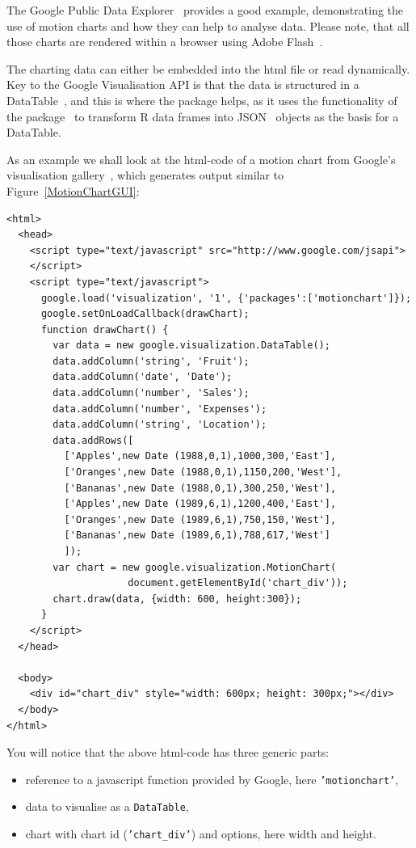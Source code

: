 The Google Public Data Explorer~\cite{GooglePublicData} provides a
good example, demonstrating the use of motion charts and how they can
help to analyse data. Please note, that all those charts are rendered
within a browser using Adobe Flash~\cite{Flash}.

The charting data can either be embedded into the html file or read
dynamically. Key to the Google Visualisation API is that the data is
structured in a DataTable~\cite{DataTable}, and this is where the \googleVis
package helps, as it uses the functionality of the \rjsonio
package~\cite{RJSONIO} to transform R data frames into
JSON~\cite{json} objects as the basis for a DataTable.

As an example we shall look at the html-code of a motion chart from Google's visualisation 
gallery~\cite{GoogleMotionChart}, which generates output similar to
Figure~\ref{MotionChartGUI}:

\begin{verbatim}
<html>
  <head>
    <script type="text/javascript" src="http://www.google.com/jsapi">
    </script>
    <script type="text/javascript">
      google.load('visualization', '1', {'packages':['motionchart']});
      google.setOnLoadCallback(drawChart);
      function drawChart() {
        var data = new google.visualization.DataTable();
        data.addColumn('string', 'Fruit');
        data.addColumn('date', 'Date');
        data.addColumn('number', 'Sales');
        data.addColumn('number', 'Expenses');
        data.addColumn('string', 'Location');
        data.addRows([
          ['Apples',new Date (1988,0,1),1000,300,'East'],
          ['Oranges',new Date (1988,0,1),1150,200,'West'],
          ['Bananas',new Date (1988,0,1),300,250,'West'],
          ['Apples',new Date (1989,6,1),1200,400,'East'],
          ['Oranges',new Date (1989,6,1),750,150,'West'],
          ['Bananas',new Date (1989,6,1),788,617,'West']
          ]);
        var chart = new google.visualization.MotionChart(
                     document.getElementById('chart_div'));
        chart.draw(data, {width: 600, height:300});
      }
    </script>
  </head>

  <body>
    <div id="chart_div" style="width: 600px; height: 300px;"></div>
  </body>
</html>
\end{verbatim}
You will notice that the above html-code has three generic parts:
\begin{itemize}
\item reference to a javascript function provided by Google, here 
	\texttt{'motionchart'},

\item data to visualise as a \texttt{DataTable}, 

\item chart with chart id (\texttt{'chart\_div'}) and options, here width
  and height. 
\end{itemize}

